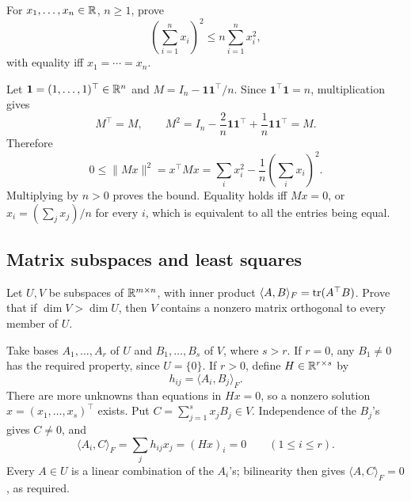 \begin{problem}\label{ex:06:sum-bound}
For \(x_1,\ldots,x_n\in\mathbb R\), \(n\geqslant1\), prove
\[
\left(\sum_{i=1}^n x_i\right)^2\leqslant n\sum_{i=1}^n x_i^2,
\]
with equality iff \(x_1=\cdots=x_n\).
\end{problem}
\begin{solution}
Let \(\boldsymbol1=(1,\ldots,1)^\top\in\mathbb R^n\) and
\(M=I_n-\boldsymbol1\boldsymbol1^\top/n\).
Since \(\boldsymbol1^\top\boldsymbol1=n\), multiplication gives
\[
M^\top=M,\qquad
M^2=I_n-\frac2n\boldsymbol1\boldsymbol1^\top
+\frac1n\boldsymbol1\boldsymbol1^\top=M.
\]
Therefore
\[
0\leqslant\|Mx\|^2=x^\top Mx
=\sum_i x_i^2-\frac1n\left(\sum_i x_i\right)^2.
\]
Multiplying by \(n>0\) proves the bound.
Equality holds iff \(Mx=0\), or
\(x_i=(\sum_jx_j)/n\) for every \(i\), which is equivalent to all
the entries being equal.
\end{solution}

\subsection*{Matrix subspaces and least squares}

\begin{problem}\label{ex:06:matrix-orthogonality}
Let \(U,V\) be subspaces of \(\mathbb R^{m\times n}\), with inner product
\(\langle A,B\rangle_F=\operatorname{tr}(A^\top B)\).
Prove that if \(\dim V>\dim U\), then \(V\) contains a nonzero matrix
orthogonal to every member of \(U\).
\end{problem}
\begin{solution}
Take bases \(A_1,\ldots,A_r\) of \(U\) and \(B_1,\ldots,B_s\) of \(V\),
where \(s>r\).
If \(r=0\), any \(B_1\ne0\) has the required property, since \(U=\{0\}\).
If \(r>0\), define \(H\in\mathbb R^{r\times s}\) by
\[
h_{ij}=\langle A_i,B_j\rangle_F.
\]
There are more unknowns than equations in \(Hx=0\), so a nonzero
solution \(x=(x_1,\ldots,x_s)^\top\) exists.
Put \(C=\sum_{j=1}^s x_jB_j\in V\).
Independence of the \(B_j\)'s gives \(C\ne0\), and
\[
\langle A_i,C\rangle_F=\sum_j h_{ij}x_j=(Hx)_i=0
\qquad(1\leqslant i\leqslant r).
\]
Every \(A\in U\) is a linear combination of the \(A_i\)'s;
bilinearity then gives \(\langle A,C\rangle_F=0\), as required.
\end{solution}

